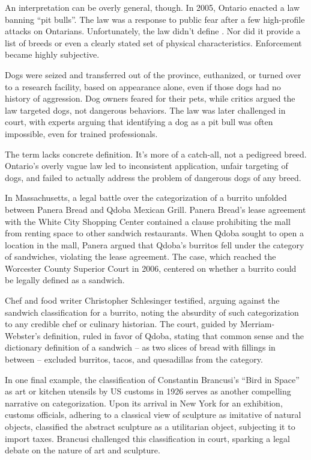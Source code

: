 An interpretation can be overly general, though. In 2005, Ontario enacted a law banning \enquote{pit bulls}. The law was a response to public fear after a few high-profile attacks on Ontarians. Unfortunately, the law didn't define . Nor did it provide a list of breeds or even a clearly stated set of physical characteristics. Enforcement became highly subjective.

Dogs were seized and transferred out of the province, euthanized, or turned over to a research facility, based on appearance alone, even if those dogs had no history of aggression. Dog owners feared for their pets, while critics argued the law targeted dogs, not dangerous behaviors. The law was later challenged in court, with experts arguing that identifying a dog as a pit bull was often impossible, even for trained professionals.

The term  lacks concrete definition. It's more of a catch-all, not a pedigreed breed. Ontario's overly vague law led to inconsistent application, unfair targeting of dogs, and failed to actually address the problem of dangerous dogs of any breed.

In Massachusetts, a legal battle over the categorization of a burrito unfolded between Panera Bread and Qdoba Mexican Grill. Panera Bread's lease agreement with the White City Shopping Center contained a clause prohibiting the mall from renting space to other sandwich restaurants. When Qdoba sought to open a location in the mall, Panera argued that Qdoba's burritos fell under the category of sandwiches, violating the lease agreement. The case, which reached the Worcester County Superior Court in 2006, centered on whether a burrito could be legally defined as a sandwich.

Chef and food writer Christopher Schlesinger testified, arguing against the sandwich classification for a burrito, noting the absurdity of such categorization to any credible chef or culinary historian. The court, guided by Merriam-Webster's definition, ruled in favor of Qdoba, stating that common sense and the dictionary definition of a sandwich -- as two slices of bread with fillings in between -- excluded burritos, tacos, and quesadillas from the category.

In one final example, the classification of Constantin Brancusi's \enquote{Bird in Space} as art or kitchen utensils by US customs in 1926 serves as another compelling narrative on categorization. Upon its arrival in New York for an exhibition, customs officials, adhering to a classical view of sculpture as imitative of natural objects, classified the abstract sculpture as a utilitarian object, subjecting it to import taxes. Brancusi challenged this classification in court, sparking a legal debate on the nature of art and sculpture.


